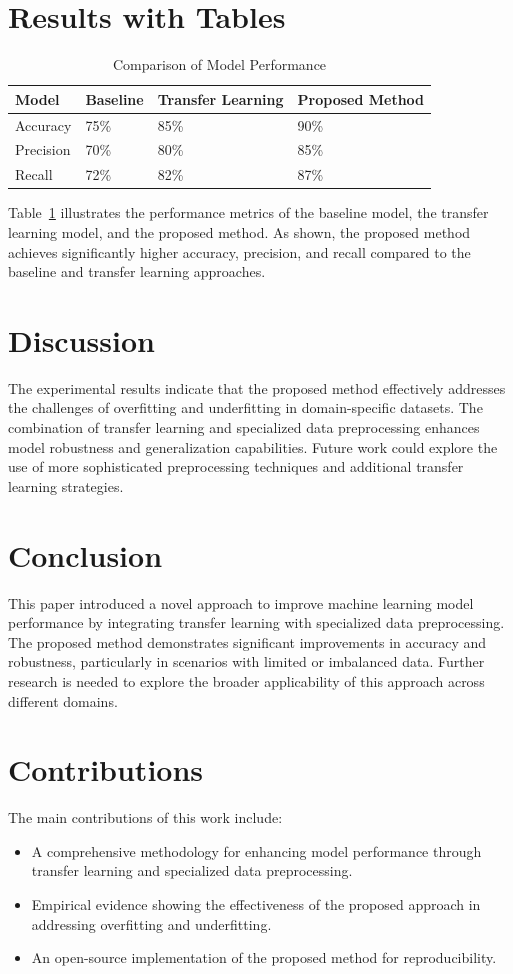 \documentclass{article}
\begin{document}
\section{Results with Tables}
\begin{table}[ht]
\centering
\begin{tabular}{@{}llll@{}}
\toprule
Model & Baseline & Transfer Learning & Proposed Method \\ \midrule
Accuracy & 75\% & 85\% & 90\% \\
Precision & 70\% & 80\% & 85\% \\
Recall & 72\% & 82\% & 87\% \\ \bottomrule
\end{tabular}
\caption{Comparison of Model Performance}
\label{tab:model_performance}
\end{table}

Table~\ref{tab:model_performance} illustrates the performance metrics of the baseline model, the transfer learning model, and the proposed method. As shown, the proposed method achieves significantly higher accuracy, precision, and recall compared to the baseline and transfer learning approaches.

\section{Discussion}
The experimental results indicate that the proposed method effectively addresses the challenges of overfitting and underfitting in domain-specific datasets. The combination of transfer learning and specialized data preprocessing enhances model robustness and generalization capabilities. Future work could explore the use of more sophisticated preprocessing techniques and additional transfer learning strategies.

\section{Conclusion}
This paper introduced a novel approach to improve machine learning model performance by integrating transfer learning with specialized data preprocessing. The proposed method demonstrates significant improvements in accuracy and robustness, particularly in scenarios with limited or imbalanced data. Further research is needed to explore the broader applicability of this approach across different domains.

\section{Contributions}
The main contributions of this work include:
\begin{itemize}
    \item A comprehensive methodology for enhancing model performance through transfer learning and specialized data preprocessing.
    \item Empirical evidence showing the effectiveness of the proposed approach in addressing overfitting and underfitting.
    \item An open-source implementation of the proposed method for reproducibility.
\end{itemize}

\printbibliography
\end{document}
